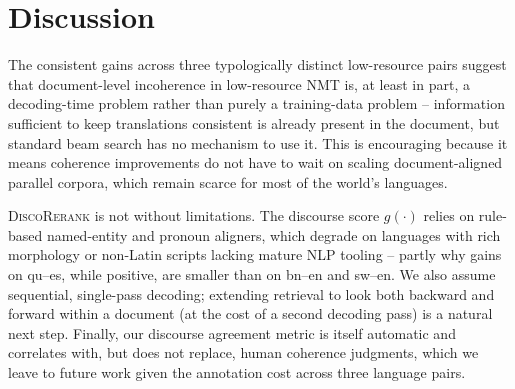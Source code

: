 \section{Discussion}

The consistent gains across three typologically distinct low-resource pairs
suggest that document-level incoherence in low-resource NMT is, at least in
part, a decoding-time problem rather than purely a training-data problem --
information sufficient to keep translations consistent is already present in
the document, but standard beam search has no mechanism to use it. This is
encouraging because it means coherence improvements do not have to wait on
scaling document-aligned parallel corpora, which remain scarce for most of
the world's languages.

\textsc{DiscoRerank} is not without limitations. The discourse score
$g(\cdot)$ relies on rule-based named-entity and pronoun aligners, which
degrade on languages with rich morphology or non-Latin scripts lacking
mature NLP tooling -- partly why gains on qu--es, while positive, are smaller
than on bn--en and sw--en. We also assume sequential, single-pass decoding;
extending retrieval to look both backward and forward within a document (at
the cost of a second decoding pass) is a natural next step. Finally, our
discourse agreement metric is itself automatic and correlates with, but does
not replace, human coherence judgments, which we leave to future work given
the annotation cost across three language pairs.

